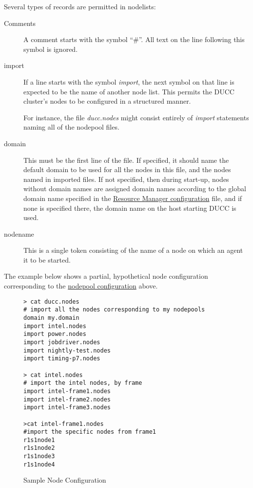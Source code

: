     Several types of records are permitted in nodelists:
    \begin{description}

      \item[Comments] A comment starts with the symbol ``$\#$''.  All text on the line
        following this symbol is ignored.

      \item[import] If a line starts with the symbol {\em import}, the next symbol on that line
        is expected to be the name of another node list.  This permits the DUCC cluster's
        nodes to be configured in a structured manner.

        For instance, the file {\em ducc.nodes} might consist entirely of {\em import} statements
        naming all of the nodepool files.
      \item[domain] This must be the first line of the file.  If specified, it should name
        the default domain to be used for all the nodes in this file, and the nodes named
        in imported files.  If not specified, then during start-up, nodes without domain names are assigned
        domain names according to the global domain name specified in the \hyperref[subsubsec:nodepool.configuration]{Resource Manager configuration}
        file, and if none is specified there, the domain name on the host starting DUCC is used.

      \item[nodename] This is a single token consisting of the name of a node on which an
        agent it to be started.

    \end{description}

    The example below shows a partial, hypothetical node configuration corresponding to the
    \hyperref[fig:nodepool.configuration]{nodepool configuration} above.

    \begin{figure}[H]

\begin{verbatim}
> cat ducc.nodes
# import all the nodes corresponding to my nodepools 
domain my.domain
import intel.nodes
import power.nodes
import jobdriver.nodes
import nightly-test.nodes
import timing-p7.nodes

> cat intel.nodes
# import the intel nodes, by frame
import intel-frame1.nodes
import intel-frame2.nodes
import intel-frame3.nodes

>cat intel-frame1.nodes
#import the specific nodes from frame1
r1s1node1
r1s1node2
r1s1node3
r1s1node4
\end{verbatim}
      \caption{Sample Node Configuration}
      \label{fig:node.configuration}

    \end{figure}    
    

